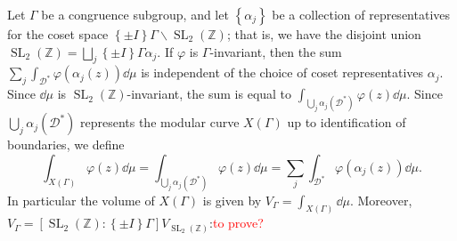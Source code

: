 \documentclass[10pt,leqno,twoside,b5paper]{article}
\theoremstyle{plain}
\theoremstyle{definition}
\numberwithin{equation}{section}
\numberwithin{lem}{section}
\newcommand{\cbr}[1]{\left\{#1\right\}}
\newcommand{\textib}[1]{\textbf{\textit{#1\index{#1}}}} %
\DeclareMathOperator{\SL}{SL}
\newcommand{\slz}{\SL_2(\mathbb{Z})}
\newcommand{\tbd}{{\Huge\color{red}{\textib{TBD}}}}
\newcommand{\sai}[1]{\textcolor{red}{#1}}
\begin{document}
Let $\varGamma$ be a congruence subgroup, and let $\cbr{\alpha_j}$ be a collection of representatives for the coset space $\cbr{\pm I}\varGamma\backslash\slz$; that is, we have the disjoint union $\slz = \bigsqcup_j \cbr{\pm I}\varGamma \alpha_j$. If $\varphi$ is $\varGamma$-invariant, then the sum $\sum_j\int_{\mathcal D^\ast}\varphi(\alpha_j(z))\dd\mu$ is independent of the choice of coset representatives $\alpha_j$. Since $\dd\mu$ is $\slz$-invariant, the sum is equal to $\int_{\bigcup_j \alpha_j(\mathcal D^\ast)}\varphi(z)\dd\mu$. Since $\bigcup_j\alpha_j(\mathcal D^\ast)$ represents the modular curve $X(\varGamma)$ up to identification of boundaries, we define 
\[\int_{X(\varGamma)}\varphi(z)\dd\mu = \int_{\bigcup_j\alpha_j(\mathcal D^\ast)}\varphi(z)\dd\mu = \sum_j\int_{\mathcal D^\ast}\varphi(\alpha_j(z))\dd\mu.\] In particular the volume of $X(\varGamma)$ is given by $V_\varGamma = \int_{X(\varGamma)}\dd\mu$. Moreover, $V_\varGamma = [\slz : \cbr{\pm I}\varGamma]V_{\slz}$:\sai{to prove?}\tbd
\end{document}
